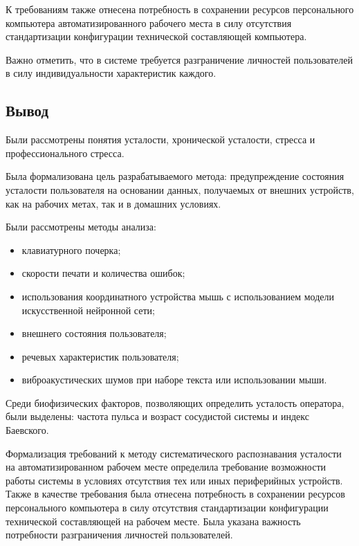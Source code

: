 К требованиям также отнесена потребность в сохранении ресурсов персонального компьютера автоматизированного рабочего места в силу отсутствия стандартизации конфигурации технической составляющей компьютера.

Важно отметить, что в системе требуется разграничение личностей пользователей в силу индивидуальности характеристик каждого.

\subsection*{Вывод}
Были рассмотрены понятия усталости, хронической усталости, стресса и профессионального стресса.

Была формализована цель разрабатываемого метода: предупреждение состояния усталости пользователя на основании данных, получаемых от внешних устройств, как на рабочих метах, так и в домашних условиях.

Были рассмотрены методы анализа:

\begin{itemize}[leftmargin=1.6\parindent]
\item клавиатурного почерка;
\item скорости печати и количества ошибок;
\item использования координатного устройства мышь с использованием модели искусственной нейронной сети;
\item внешнего состояния пользователя;
\item речевых характеристик пользователя;
\item виброакустических шумов при наборе текста или использовании мыши.
\end{itemize}

Среди биофизических факторов, позволяющих определить усталость оператора, были выделены: частота пульса и возраст сосудистой системы и индекс Баевского.

Формализация требований к методу систематического распознавания усталости на автоматизированном рабочем месте определила требование  возможности работы системы в условиях отсутствия тех или иных периферийных ус\-тройств. Также в качестве требования была отнесена потребность в сохранении ресурсов персонального компьютера в силу отсутствия стандартизации конфигурации технической составляющей на рабочем месте. Была указана важность потребности разграничения личностей пользователей.

\pagebreak